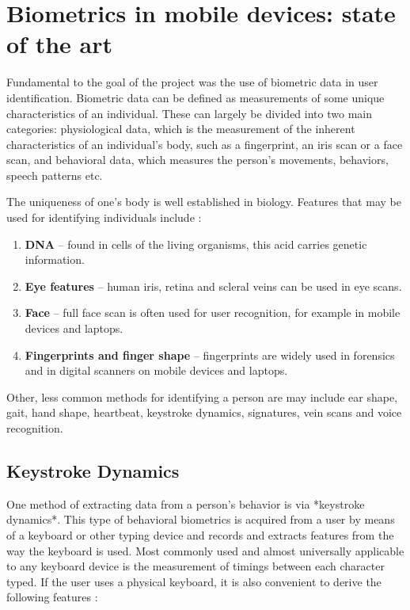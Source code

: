 
\chapter{Biometrics in mobile devices: state of the art} \label{biometrics_theory}

Fundamental to the goal of the project was the use of biometric data in user identification. Biometric data can be defined as measurements of some unique characteristics of an individual. These can largely be divided into two main categories: physiological data, which is the measurement of the inherent characteristics of an individual's body, such as a fingerprint, an iris scan or a face scan, and behavioral data, which measures the person's movements, behaviors, speech patterns etc. \cite{Abde2023}

The uniqueness of one's body is well established in biology. Features that may be used for identifying individuals include \cite{biometrics_institute_2025}:

\begin{enumerate}
    \item \textbf{DNA} -- found in cells of the living organisms, this acid carries genetic information.
    \item \textbf{Eye features} -- human iris, retina and scleral veins can be used in eye scans.
    \item \textbf{Face} -- full face scan is often used for user recognition, for example in mobile devices and laptops. \cite{google_mlkit_face_detection_2025}
    \item \textbf{Fingerprints and finger shape} -- fingerprints are widely used in forensics \cite{nist_forensic_biometrics_2025} and in digital scanners on mobile devices and laptops.
\end{enumerate}

Other, less common methods for identifying a person are may include ear shape, gait, hand shape, heartbeat, keystroke dynamics, signatures, vein scans and voice recognition.

\section{Keystroke Dynamics}
One method of extracting data from a person's behavior is via *keystroke dynamics*. This type of behavioral biometrics is acquired from a user by means of a keyboard or other typing device and records and extracts features from the way the keyboard is used. Most commonly used and almost universally applicable to any keyboard device is the measurement of timings between each character typed. If the user uses a physical keyboard, it is also convenient to derive the following features \cite{Shar2023}:


